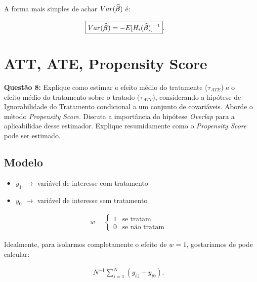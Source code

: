 \documentclass[11pt,oneside,a4paper]{article}
\numberwithin{equation}{section}
\begin{document}
\begin{description}
\begin{description}
A forma mais simples de achar $Var ( {\widehat{\boldsymbol{\beta}}} )$ é:

\vspace{-1 em}
\begin{align*}
	\Aboxed{
Var( \widehat{\mbs{\beta}} )
&=
- E[ H_{i} ( \widehat{\mbs{\beta}} ) ]^{-1} }.
\end{align*}

\clearpage
\section{ATT, ATE, Propensity Score}

\noindent
\textbf{Questão 8:}
Explique como estimar o efeito médio do tratamente ($\tau_{ATE}$) e o efeito médio do tratamento sobre o tratado ($\tau_{ATT}$), considerando a hipótese de Ignorabilidade do Tratamento condicional a um conjunto de covariáveis.
Aborde o método \textit{Propensity Score}.
Discuta a importância do hipótese \textit{Overlap} para a aplicabilidae desse estimador.
Explique resumidamente como o \textit{Propensity Score} pode ser estimado.

\subsection*{Modelo}

\begin{itemize}\itemsep0pt
\item
$y_{1}$ $\rightarrow$ variável de interesse com tratamento

\item
$y_{0}$ $\rightarrow$ variável de interesse sem tratamento
\end{itemize}

\vspace{-1 em}
\begin{align*}
w = 
\begin{cases}
1 & \text{se tratam}
\\
0 & \text{se não tratam}
\end{cases}
\end{align*}
 
Idealmente, para isolarmos completamente o efeito de $w=1$, gostaríamos de pode calcular:

\vspace{-1 em}
\begin{align*}
	N^{-1} \sum_{i=1}^{N}
	\left( y_{i1} - y_{i0} \right).
\end{align*}


\end{description}
\end{description}
\end{document}
